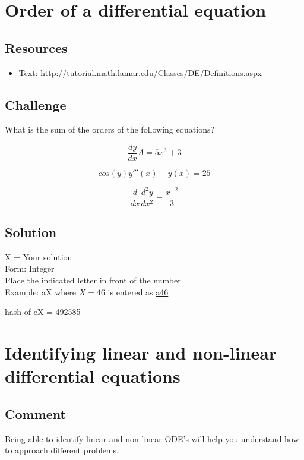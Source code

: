 \section{Order of a differential equation}

\subsection*{Resources}
\begin{itemize}
    \item Text: \url{http://tutorial.math.lamar.edu/Classes/DE/Definitions.aspx}
\end{itemize}

\subsection*{Challenge}
What is the sum of the orders of the following equations?

\begin{equation}
    \frac{dy}{dx}A = 5x^3 + 3
\end{equation}

\begin{equation}
    cos(y) y'''(x) - y(x) = 25
\end{equation}

\begin{equation}
    \frac{d}{dx} \frac{d^2 y}{dx^2} = \frac{x^{-2}}{3}
\end{equation}

\subsection*{Solution}
X = Your solution\\
Form: Integer\\
Place the indicated letter in front of the number\\
Example: aX where $X=46$ is entered as \href{http://www.wolframalpha.com/input/?i=md5+hash+of+\%22a46\%22}{a46}

hash of eX = 492585




\newpage
\section{Identifying linear and non-linear differential equations}

\subsection*{Comment}
Being able to identify linear and non-linear ODE's will help you understand how to approach different problems.

